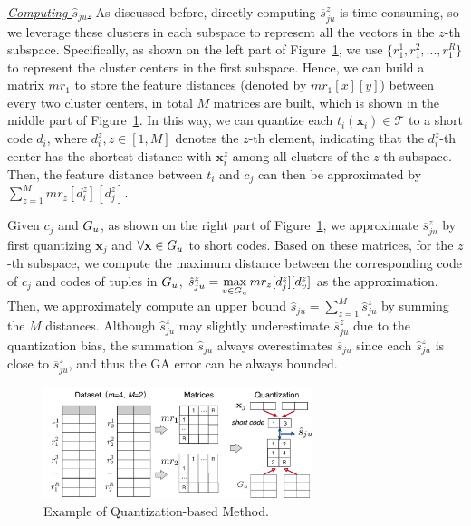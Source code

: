 \noindent  \underline{\textit{Computing $\hat{s}_{ju}$.}}
As discussed before,
directly computing $\overline{s}_{ju}^z$ is time-consuming, so we leverage these  clusters in each subspace to represent all the vectors in the $z$-th subspace. %
%
 Specifically, as shown on the left part of Figure~\ref{fig:codebook}, we use $\{r_1^1, r_1^2,..., r_1^R\}$ to represent the  cluster centers in the first subspace. %
 Hence, we can build a matrix $mr_1$ to store the feature distances (denoted by $mr_1[x][y]$) between every two cluster centers, in total  $M$ matrices are built, which is shown in the middle part of Figure~\ref{fig:codebook}.
 In this way, we can quantize each $t_i (\mathbf{x}_i) \in \mathcal{T}$  to a short code $d_i$, where $d_i^z, z\in[1,M]$  denotes the $z$-th element, indicating that the $d_i^z$-th center has the shortest distance with $\mathbf{x}_i^z$ among all clusters of the $z$-th subspace. 
 Then, the feature distance between  $t_i$ and $c_j$ can then be approximated by $\sum_{z=1}^{M}mr_z[d_i^z][d_j^z]$.

Given $c_j$ and $G_u$, as shown on the right part of Figure~\ref{fig:codebook}, we approximate $\overline{s}_{ju}^z$ by first quantizing $\mathbf{x}_{j}$ and  $\forall \mathbf{x} \in G_u$ to short codes. Based on these matrices, for the $z$-th subspace, we compute the maximum distance between the corresponding code of $c_j$ and codes of tuples in $G_u$, \ie $\hat{s}_{ju}^z = \max\limits_{v\in G_u}mr_z[d_{j}^z][d_v^z]$ as the approximation. Then, we approximately compute an upper bound $\hat{s}_{ju}=\sum_{z=1}^{M}\hat{s}_{ju}^z$ by summing the $M$ distances. Although $\hat{s}_{ju}^z$ may slightly underestimate $\overline{s}^z_{ju}$ due to the quantization bias, the summation $\hat{s}_{ju}$ always overestimates $\overline{s}_{ju}$ since each $\hat{s}_{ju}^z$ is close to $\overline{s}^z_{ju}$, and thus the GA error can be always bounded.

\begin{figure}[t]
    \centering
    \includegraphics[width=0.7\textwidth]{figs/pq}
    \caption{Example of  Quantization-based Method.}
    \label{fig:codebook}
\end{figure}



